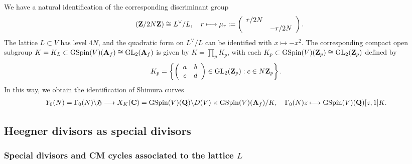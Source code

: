 \documentclass{amsart}
\theoremstyle{definition}
\theoremstyle{definition}
\theoremstyle{definition}
\begin{document}
We have a natural identification of the corresponding discriminant group
\begin{align}\label{natural} ({\bf{Z}}/ 2 N {\bf{Z}}) \cong L^{\vee}/L, \quad r \longmapsto \mu_r := \left( \begin{array}{cc} r/2N & ~~\\~& - r/2N \end{array} \right). \end{align}
The lattice $L \subset V$ has level $4N$, and the quadratic form on $L^{\vee}/L$ can be identified with $x \mapsto -x^2$.
The corresponding compact open subgroup $K = K_L \subset \operatorname{GSpin}(V)({\bf{A}}_f) \cong \operatorname{GL}_2({\bf{A}}_f)$
is given by $K= \prod_p K_p$, with each $K_p \subset \operatorname{GSpin}(V)({\bf{Z}}_p) \cong \operatorname{GL}_2({\bf{Z}}_p)$ defined by 
\begin{align*} K_p &= \left\lbrace \left( \begin{array}{cc} a & b \\c & d \end{array} \right) \in \operatorname{GL}_2({\bf{Z}}_p) : c \in N {\bf{Z}}_p \right\rbrace. \end{align*}
In this way, we obtain the identification of Shimura curves 
\begin{align}\label{ncMC} Y_0(N) = \Gamma_0(N) \backslash \mathfrak{H} &\longrightarrow X_K({\bf{C}}) 
= \operatorname{GSpin}(V)({\bf{Q}}) \backslash D(V) \times \operatorname{GSpin}(V)({\bf{A}}_f)/K, 
\quad \Gamma_0(N) z \longmapsto \operatorname{GSpin}(V)({\bf{Q}}) [z, 1] K. \end{align}

\subsection{Heegner divisors as special divisors}

\subsubsection{Special divisors and CM cycles associated to the lattice $L$}
\end{document}
